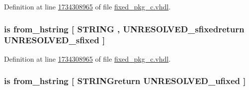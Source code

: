 Definition at line \hyperlink{fixed__pkg__c_8vhdl_source_l1734308965}{1734308965} of file \hyperlink{fixed__pkg__c_8vhdl_source}{fixed\+\_\+pkg\+\_\+c.\+vhdl}.

\hypertarget{classfixed__pkg_a1f47bd651be4e4193398e4a1b0bc717d}{}
\subsubsection[{from\+\_\+hex\+\_\+string}]{ {\bfseries \textcolor{keywordflow}{is}\textcolor{vhdlchar}{ }\textcolor{vhdlchar}{from\+\_\+hstring}\textcolor{vhdlchar}{ }\textcolor{vhdlchar}{\mbox{[}}\textcolor{vhdlchar}{ }\textcolor{comment}{S\+T\+R\+I\+N\+G}\textcolor{vhdlchar}{ }\textcolor{vhdlchar}{,}\textcolor{vhdlchar}{ }\textcolor{vhdlchar}{U\+N\+R\+E\+S\+O\+L\+V\+E\+D\+\_\+sfixedreturn}\textcolor{vhdlchar}{ }{\bfseries {\bf U\+N\+R\+E\+S\+O\+L\+V\+E\+D\+\_\+sfixed}} \textcolor{vhdlchar}{ }\textcolor{vhdlchar}{\mbox{]}}\textcolor{vhdlchar}{ }} \hspace{0.3cm}{\ttfamily [Alias]}}\label{classfixed__pkg_a1f47bd651be4e4193398e4a1b0bc717d}


Definition at line \hyperlink{fixed__pkg__c_8vhdl_source_l1734308965}{1734308965} of file \hyperlink{fixed__pkg__c_8vhdl_source}{fixed\+\_\+pkg\+\_\+c.\+vhdl}.

\hypertarget{classfixed__pkg_a45012e8233db26718c3d252d329e30c6}{}
\subsubsection[{from\+\_\+hex\+\_\+string}]{ {\bfseries \textcolor{keywordflow}{is}\textcolor{vhdlchar}{ }\textcolor{vhdlchar}{from\+\_\+hstring}\textcolor{vhdlchar}{ }\textcolor{vhdlchar}{\mbox{[}}\textcolor{vhdlchar}{ }\textcolor{vhdlchar}{S\+T\+R\+I\+N\+Greturn}\textcolor{vhdlchar}{ }{\bfseries {\bf U\+N\+R\+E\+S\+O\+L\+V\+E\+D\+\_\+ufixed}} \textcolor{vhdlchar}{ }\textcolor{vhdlchar}{\mbox{]}}\textcolor{vhdlchar}{ }} \hspace{0.3cm}{\ttfamily [Alias]}}\label{classfixed__pkg_a45012e8233db26718c3d252d329e30c6}


